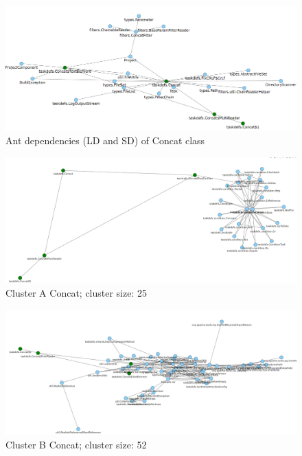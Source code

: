 \documentclass[conference]{IEEEtran}
\begin{document}
\begin{figure}
\centering
\includegraphics[width=\columnwidth]{dep_concat.png}
\caption{Ant dependencies (LD and SD) of Concat class}
\label{fig:dep_concat}
\centering
\end{figure}

\begin{figure}
\centering
\includegraphics[width=\columnwidth]{cluster_concatSD.PNG}
\caption{Cluster A Concat; cluster size: 25}
\label{fig:clusterAconcat}
\centering
\end{figure}


\begin{figure}
\centering
\includegraphics[width=\columnwidth]{cluster_concatSDLD.PNG}
\caption{Cluster B Concat; cluster size: 52}
\label{fig:clusterBconcat}
\centering
\end{figure}
\end{document}
